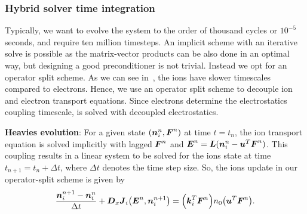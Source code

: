 
\subsubsection{Hybrid solver time integration}
Typically, we want to evolve the system to the order of thousand cycles or $10^{-5}$ seconds, and require ten million timesteps. An implicit scheme with an iterative solve is possible as the matrix-vector products can be also done in an optimal way, but designing a good preconditioner is not trivial. Instead we opt for an operator split scheme.
As we can see in~, the ions have slower timescales compared to electrons. Hence, we use an operator split scheme to decouple ion and electron transport equations. Since electrons determine the electrostatics coupling timescale,  is solved with decoupled electrostatics.

\par \textbf{Heavies evolution}: For a given state $(\boldsymbol{n}_i^n, \boldsymbol{F}^n)$ at time $t=t_n$, the ion transport equation is solved implicitly with lagged $\boldsymbol{F}^n$ and $\boldsymbol{E}^n = \boldsymbol{L} (\boldsymbol{n}^n_i - \boldsymbol{u}^T \boldsymbol{F}^n)$. This coupling results in a linear system to be solved for the ions state at time $t_{n+1}=t_n +  \Delta t$, where $\Delta t$ denotes the time step size. So, the ions update in our operator-split scheme is given by
\begin{equation}
	\frac{\vect n^{n+1}_i -\vect n^n_i}{\Delta t} + \vect{D}_x \vect J_i \of{\vect E^n, \vect n^{n+1}_i}= \of{\vect k_i^T \vect F^n} n_0 \of{\vect u^T \vect F^n} \label{eq:fluid_step}.
\end{equation}


